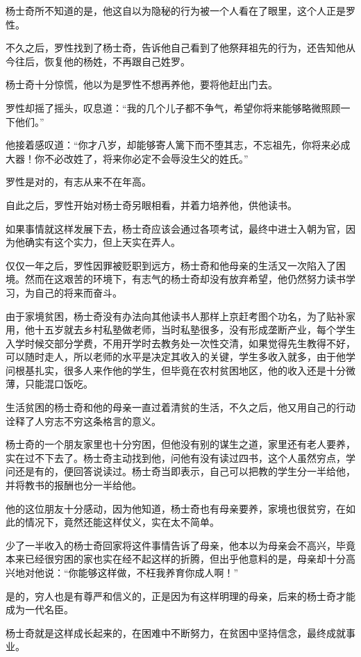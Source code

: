 \begin{multicols}{\theparacolNo}
杨士奇所不知道的是，他这自以为隐秘的行为被一个人看在了眼里，这个人正是罗性。

不久之后，罗性找到了杨士奇，告诉他自己看到了他祭拜祖先的行为，还告知他从今往后，恢复他的杨姓，不再跟自己姓罗。

杨士奇十分惊慌，他以为是罗性不想再养他，要将他赶出门去。

罗性却摇了摇头，叹息道：“我的几个儿子都不争气，希望你将来能够略微照顾一下他们。”

他接着感叹道：“你才八岁，却能够寄人篱下而不堕其志，不忘祖先，你将来必成大器！你不必改姓了，将来你必定不会辱没生父的姓氏。”

罗性是对的，有志从来不在年高。

自此之后，罗性开始对杨士奇另眼相看，并着力培养他，供他读书。

如果事情就这样发展下去，杨士奇应该会通过各项考试，最终中进士入朝为官，因为他确实有这个实力，但上天实在弄人。

仅仅一年之后，罗性因罪被贬职到远方，杨士奇和他母亲的生活又一次陷入了困境。然而在这艰苦的环境下，有志气的杨士奇却没有放弃希望，他仍然努力读书学习，为自己的将来而奋斗。

由于家境贫困，杨士奇没有办法向其他读书人那样上京赶考图个功名，为了贴补家用，他十五岁就去乡村私塾做老师，当时私塾很多，没有形成垄断产业，每个学生入学时候交部分学费，不用开学时去教务处一次性交清，如果觉得先生教得不好，可以随时走人，所以老师的水平是决定其收入的关键，学生多收入就多，由于他学问根基扎实，很多人来作他的学生，但毕竟在农村贫困地区，他的收入还是十分微薄，只能混口饭吃。

生活贫困的杨士奇和他的母亲一直过着清贫的生活，不久之后，他又用自己的行动诠释了人穷志不穷这条格言的意义。

杨士奇的一个朋友家里也十分穷困，但他没有别的谋生之道，家里还有老人要养，实在过不下去了。杨士奇主动找到他，问他有没有读过四书，这个人虽然穷点，学问还是有的，便回答说读过。杨士奇当即表示，自己可以把教的学生分一半给他，并将教书的报酬也分一半给他。

他的这位朋友十分感动，因为他知道，杨士奇也有母亲要养，家境也很贫穷，在如此的情况下，竟然还能这样仗义，实在太不简单。

少了一半收入的杨士奇回家将这件事情告诉了母亲，他本以为母亲会不高兴，毕竟本来已经很穷困的家也实在经不起这样的折腾，但出乎他意料的是，母亲却十分高兴地对他说：“你能够这样做，不枉我养育你成人啊！”

是的，穷人也是有尊严和信义的，正是因为有这样明理的母亲，后来的杨士奇才能成为一代名臣。

杨士奇就是这样成长起来的，在困难中不断努力，在贫困中坚持信念，最终成就事业。


\end{multicols}
